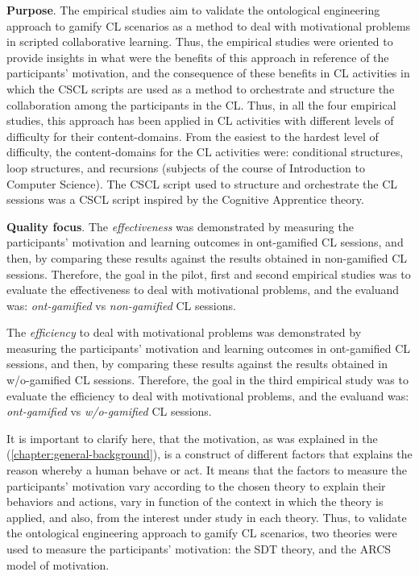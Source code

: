 \textbf{Purpose}.
The empirical studies aim to validate the ontological engineering approach to gamify CL scenarios as a method to deal with motivational problems in scripted collaborative learning. 
Thus, the empirical studies were oriented to provide insights in what were the benefits of this approach in reference of the participants' motivation, and the consequence of these benefits in CL activities in which the CSCL scripts are used as a method to orchestrate and structure the collaboration among the participants in the CL.
Thus, in all the four empirical studies, this approach has been applied in CL activities with different levels of difficulty for their content-domains.
From the easiest to the hardest level of difficulty, the content-domains for the CL activities were: conditional structures, loop structures, and recursions (subjects of the course of Introduction to Computer Science).
The CSCL script used to structure and orchestrate the CL sessions was a CSCL script inspired by the Cognitive Apprentice theory.

\textbf{Quality focus}.
The \emph{effectiveness} was demonstrated by measuring the participants' motivation and learning outcomes in ont-gamified CL sessions, and then, by comparing these results against the results obtained in non-gamified CL sessions.
Therefore, the goal in the pilot, first and second empirical studies was to evaluate the effectiveness to deal with motivational problems, and the evaluand was: \emph{ont-gamified} vs \emph{non-gamified} CL sessions.

The \emph{efficiency} to deal with motivational problems was demonstrated by measuring the participants' motivation and learning outcomes in ont-gamified CL sessions, and then, by comparing these results against the results obtained in w/o-gamified CL sessions.
Therefore, the goal in the third empirical study was to evaluate the efficiency to deal with motivational problems, and the evaluand was: \emph{ont-gamified} vs \emph{w/o-gamified} CL sessions.

It is important to clarify here, that the motivation, as was explained in the  (\autoref{chapter:general-background}), is a construct of different factors that explains the reason whereby a human behave or act.
It means that the factors to measure the participants' motivation vary according to the chosen theory to explain their behaviors and actions, vary in function of the context in which the theory is applied, and also, from the interest under study in each theory.
Thus, to validate the ontological engineering approach to gamify CL scenarios, two theories were used to measure the participants' motivation: the SDT theory, and the ARCS model of motivation.

